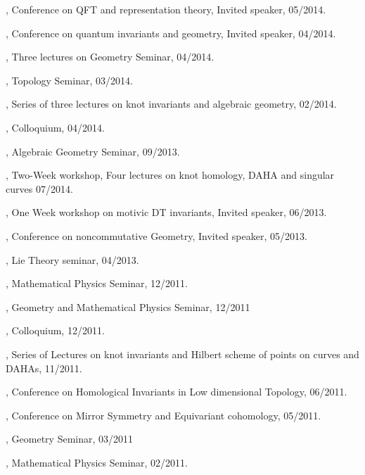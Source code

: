 \documentclass[11pt]{amsart}
\theoremstyle{plain}
\theoremstyle{definition}
\theoremstyle{remark}
\begin{document}
, Conference on QFT and representation theory, Invited speaker, 05/2014.

, Conference on quantum invariants and geometry, Invited speaker, 04/2014.

, Three lectures on Geometry Seminar, 04/2014.

, Topology Seminar, 03/2014.

, Series of three lectures on knot invariants and algebraic geometry, 02/2014.

, Colloquium, 04/2014.

, Algebraic Geometry Seminar, 09/2013.

, Two-Week workshop, Four lectures on knot homology, DAHA and singular curves 07/2014.

, {One Week workshop on motivic DT invariants}, Invited speaker, 06/2013.

, {Conference on noncommutative Geometry}, Invited speaker, 05/2013.

, Lie Theory seminar, 04/2013.

, Mathematical Physics Seminar, 12/2011.

, Geometry and Mathematical Physics Seminar, 12/2011

, Colloquium, 12/2011.

, Series of Lectures on knot invariants and Hilbert scheme of points
on curves and DAHAs, 11/2011.

, Conference on Homological Invariants in Low dimensional 
Topology, 06/2011.

, Conference on Mirror Symmetry and Equivariant 
cohomology, 05/2011.

, Geometry Seminar, 03/2011

, Mathematical Physics Seminar, 02/2011.
\end{document}
